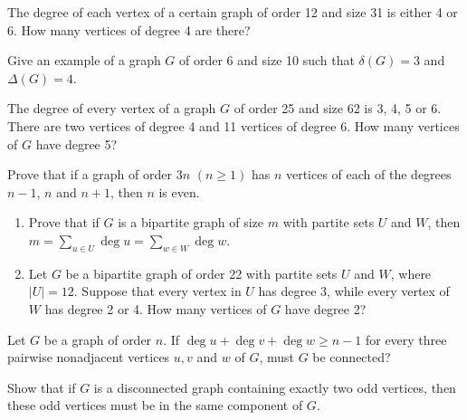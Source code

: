 \begin{exer}
The degree of each vertex of a certain graph of order 12 and size 31 is either 4 or 6. How many vertices of degree 4 are there?
\end{exer}

\begin{exer}
Give an example of a graph $G$ of order 6 and size 10 such that $\delta(G) = 3$ and $\Delta(G) = 4$.
\end{exer}

\begin{exer}
The degree of every vertex of a graph $G$ of order 25 and size 62 is 3, 4, 5 or 6. There are two vertices of degree 4 and 11 vertices of degree 6. How many vertices of $G$ have degree 5?
\end{exer}

\begin{exer}
Prove that if a graph of order $3n$ $(n \geq 1)$ has $n$ vertices of each of the degrees $n-1$, $n$ and $n+1$, then $n$ is even.
\end{exer}

\begin{exer}
\begin{enumerate}[{(a)}]
\item Prove that if $G$ is a bipartite graph of size $m$ with partite sets $U$ and $W$, then $m = \sum_{u \in U} \deg{}{u} = \sum_{w \in W} \deg{}{w}$.
\item Let $G$ be a bipartite graph of order 22 with partite sets $U$ and $W$, where $|U| = 12$. Suppose that every vertex in $U$ has degree 3, while every vertex of $W$ has degree 2 or 4. How many vertices of $G$ have degree 2?
\end{enumerate}
\end{exer}

\begin{exer}
Let $G$ be a graph of order $n$. If $\deg{}{u}+\deg{}{v}+\deg{}{w} \geq n-1$ for every three pairwise nonadjacent vertices $u,v$ and $w$ of $G$, must $G$ be connected?
\end{exer}

\begin{exer}
Show that if $G$ is a disconnected graph containing exactly two odd vertices, then these odd vertices must be in the same component of $G$.
\end{exer}

